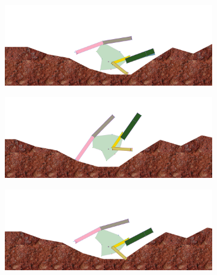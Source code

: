         \begin{figure}[H]
          \centering
          \begin{subfigure}[b]{0.45\textwidth}
            \includegraphics[width=\linewidth,center]{graphics/simulation-results/4_gen7000_1}
            \caption{\label{fig:gen7000_1}}
          \end{subfigure}
          \begin{subfigure}[b]{0.45\textwidth}
            \includegraphics[width=\linewidth,center]{graphics/simulation-results/4_gen7000_2}
            \caption{\label{fig:gen7000_2}}
          \end{subfigure}
          \begin{subfigure}[b]{0.45\textwidth}
            \includegraphics[width=\linewidth,center]{graphics/simulation-results/4_gen7000_3}
            \caption{\label{fig:gen7000_3}}
          \end{subfigure}
          \begin{subfigure}[b]{0.45\textwidth}

\end{subfigure}
\end{figure}
